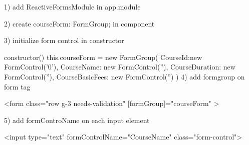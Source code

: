 1) add ReactiveFormsModule in app.module

2) create
  courseForm: FormGroup; in component

3) initialize form control in constructor

constructor() {
    this.courseForm = new FormGroup({
      CourseId:new FormControl('0'),
      CourseName: new FormControl(''),
      CourseDuration: new FormControl(''),
      CourseBasicFees: new FormControl('')
    })
   }
4) add formgroup on form tag

<form class="row g-3 needs-validation" [formGroup]="courseForm"  >

5) add formControName on each input element

  <input type="text" formControlName="CourseName" class="form-control">
